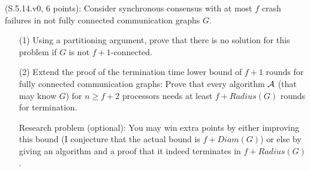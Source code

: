 
\begin{Exc}{(S.5.14.v0, 6 points):}
Consider synchronous consensus with at most $f$ crash failures in not
fully connected communication graphs $G$.
\begin{enumerate}
\item[(1)] Using a partitioning argument, prove that there is no solution for this problem if $G$
is not $f+1$-connected.
\item[(2)] Extend the proof of the termination time lower bound of $f+1$ rounds
for fully connected communication graphs: Prove that every algorithm ${\cal A}$
(that may know $G$) for $n\geq f+2$ processors needs at least $f+Radius(G)$ rounds
for termination.

Research problem (optional): You may win extra points by either improving this
bound (I conjecture that the actual bound is $f+Diam(G)$) or else
by giving an algorithm and a proof that it indeed terminates in
$f+Radius(G)$.
\end{enumerate}
\end{Exc}
